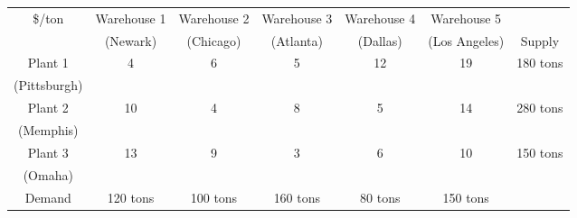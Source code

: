 \documentclass[11pt]{article}
\theoremstyle{definition}
\begin{document}
\begin{center}\begin{tabular}{|ccccccc|}\hline
  \$/ton   & Warehouse 1 & Warehouse 2 & Warehouse 3 & Warehouse 4 & Warehouse 5 &            \\
           &   (Newark) &  (Chicago) &  (Atlanta) &   (Dallas) & (Los Angeles) &   Supply   \\\cline{2-7}
   Plant 1 & \multicolumn{1}{|c|}{4} & \multicolumn{1}{|c|}{6} & \multicolumn{1}{|c|}{5} & \multicolumn{1}{|c|}{12} & \multicolumn{1}{|c|}{19} &    180 tons \\
(Pittsburgh) & \multicolumn{1}{|c|}{} & \multicolumn{1}{|c|}{} & \multicolumn{1}{|c|}{} & \multicolumn{1}{|c|}{} & \multicolumn{1}{|c|}{} &            \\ \cline{2-6}
   Plant 2 & \multicolumn{1}{|c|}{10} & \multicolumn{1}{|c|}{4} & \multicolumn{1}{|c|}{8} & \multicolumn{1}{|c|}{5} & \multicolumn{1}{|c|}{14} &    280 tons \\
 (Memphis) & \multicolumn{1}{|c|}{} & \multicolumn{1}{|c|}{} & \multicolumn{1}{|c|}{} & \multicolumn{1}{|c|}{} & \multicolumn{1}{|c|}{} &            \\ \cline{2-6}
   Plant 3 & \multicolumn{1}{|c|}{13} & \multicolumn{1}{|c|}{9} & \multicolumn{1}{|c|}{3} & \multicolumn{1}{|c|}{6} & \multicolumn{1}{|c|}{10} &    150 tons \\
   (Omaha) & \multicolumn{1}{|c|}{} & \multicolumn{1}{|c|}{} & \multicolumn{1}{|c|}{} & \multicolumn{1}{|c|}{} & \multicolumn{1}{|c|}{} &            \\ \cline{1-6}
   Demand &    120 tons &    100 tons &    160 tons &     80 tons &    150 tons &            \\ \hline
\end{tabular}\end{center}
\end{document}
